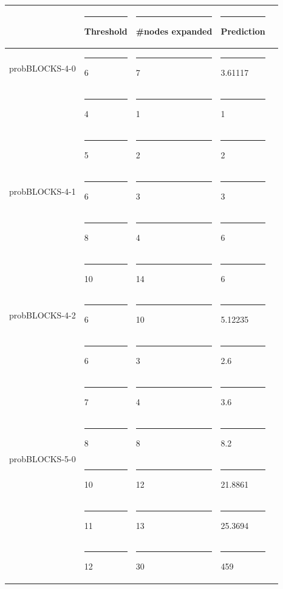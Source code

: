\documentclass[11pt,a4paper,oneside]{report}
\begin{document}
\footnotesize  %
\setlength\LTleft{100pt}            %
\setlength\LTright{200pt}           %
\begin{longtable}{@{\extracolsep{\fill}} lllll @{}}
\hline
                                &\rule{4pt}{0ex} Threshold &\rule{4pt}{0ex} \#nodes expanded &\rule{4pt}{0ex} Prediction \\ \hline
probBLOCKS-4-0                  &\rule{4pt}{0ex} 6         &\rule{4pt}{0ex} 7                &\rule{4pt}{0ex} 3.61117    \\ \hline
\multirow{5}{*}{probBLOCKS-4-1} &\rule{4pt}{0ex} 4         &\rule{4pt}{0ex} 1                &\rule{4pt}{0ex} 1          \\ \cline{2-4} 
                                &\rule{4pt}{0ex} 5         &\rule{4pt}{0ex} 2                &\rule{4pt}{0ex} 2          \\ \cline{2-4} 
                                &\rule{4pt}{0ex} 6         &\rule{4pt}{0ex} 3                &\rule{4pt}{0ex} 3          \\ \cline{2-4}
                                &\rule{4pt}{0ex} 8         &\rule{4pt}{0ex} 4                &\rule{4pt}{0ex} 6          \\ \cline{2-4}
                                &\rule{4pt}{0ex} 10        &\rule{4pt}{0ex} 14               &\rule{4pt}{0ex} 6          \\ \hline
probBLOCKS-4-2                  &\rule{4pt}{0ex} 6         &\rule{4pt}{0ex} 10                &\rule{4pt}{0ex} 5.12235    \\ \hline
\multirow{6}{*}{probBLOCKS-5-0} &\rule{4pt}{0ex} 6         &\rule{4pt}{0ex} 3                &\rule{4pt}{0ex} 2.6         \\ \cline{2-4}
							   &\rule{4pt}{0ex} 7         &\rule{4pt}{0ex} 4                &\rule{4pt}{0ex} 3.6         \\ \cline{2-4}
							   &\rule{4pt}{0ex} 8         &\rule{4pt}{0ex} 8                &\rule{4pt}{0ex} 8.2         \\ \cline{2-4}
							   &\rule{4pt}{0ex} 10        &\rule{4pt}{0ex} 12               &\rule{4pt}{0ex} 21.8861     \\ \cline{2-4}
							   &\rule{4pt}{0ex} 11        &\rule{4pt}{0ex} 13               &\rule{4pt}{0ex} 25.3694     \\ \cline{2-4}
							   &\rule{4pt}{0ex} 12        &\rule{4pt}{0ex} 30               &\rule{4pt}{0ex} 459         \\ \hline

\end{longtable}
\end{document}
